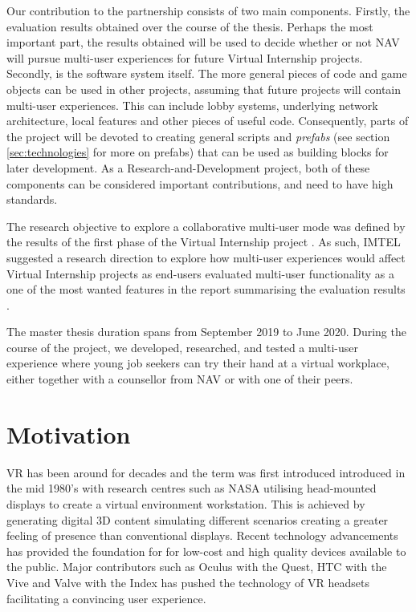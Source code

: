
Our contribution to the partnership consists of two main components. Firstly, the evaluation results obtained over the course of the thesis. Perhaps the most important part, the results obtained will be used to decide whether or not NAV will pursue multi-user experiences for future Virtual Internship projects. Secondly, is the software system itself. The more general pieces of code and game objects can be used in other projects, assuming that future projects will contain multi-user experiences. This can include lobby systems, underlying network architecture, local features and other pieces of useful code. Consequently, parts of the project will be devoted to creating general scripts and \textit{prefabs} (see section \ref{sec:technologies} for more on prefabs) that can be used as building blocks for later development. As a Research-and-Development project, both of these components can be considered important contributions, and need to have high standards.


The research objective to explore a collaborative multi-user mode was defined by the results of the first phase of the Virtual Internship project \cite{NavVRrapport}. As such, IMTEL suggested a research direction to explore how multi-user experiences would affect Virtual Internship projects as end-users evaluated multi-user functionality as a one of the most wanted features in the report summarising the evaluation results \cite{NavVRrapport}.    




The master thesis duration spans from September 2019 to June 2020. During the course of the project, we developed, researched, and tested a multi-user experience where young job seekers can try their hand at a virtual workplace, either together with a counsellor from NAV or with one of their peers.

\section{Motivation}
VR has been around for decades and the term was first introduced introduced in the mid 1980's \cite{historyVR} with research centres such as NASA utilising head-mounted displays to create a virtual environment workstation. This is achieved by generating digital 3D content simulating different scenarios creating a greater feeling of presence than conventional displays. Recent technology advancements has provided the foundation for for low-cost and high quality devices available to the public. Major contributors such as Oculus with the Quest, HTC with the Vive and Valve with the Index has pushed the technology of VR headsets facilitating a convincing user experience.  

